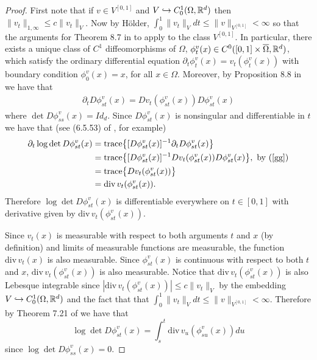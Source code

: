 \documentclass[noinfoline]{imsart}
\begin{document}
\begin{proof}
First note that if $v\in V^{[0,1]}$ and $V\hookrightarrow C_0^1(\Omega, \Bbb R^d)$ then $ \| v_t \|_{1,\infty} \leq c \| v_t \|_{V} $. Now by H\"older, $\int_0^1 \| v_t \|_{V} dt \leq \|v \|_{V^{[0,1]}}<\infty$  so that the arguments for  Theorem 8.7   in \cite{you:10} to apply to the class  $ V^{[0,1]}$. In particular, there exists a unique  class of $C^1$ diffeomorphisms of $\Omega$, $\phi_t^v(x)\in C^0 ([0,1]\times \overline \Omega,\Bbb R^d)$, which satisfy the ordinary differential equation $\partial_t \phi_t^v(x) = v_t(\phi_t^v(x))$
 with boundary condition $\phi_0^v(x)=x$, for all $x\in \Omega$. Moreover, by Proposition 8.8 in \cite{you:10} we have that
 \begin{align}
    \partial_t D\phi_{st}^v(x)  =  D v_t (\phi_{st}^v(x))  D\phi_{st}^v(x) \label{gg}
\end{align}
where $\det D\phi_{ss}^v(x)=Id_d$. 
Since $D\phi_{st}^v(x)$ is nonsingular and differentiable in $t$ we have that (see  (6.5.53) of \cite{hor:91}, for example)
\begin{align*}
\partial_t \log \det D\phi_{st}^v(x)&= \text{trace}\bigl\{ [D\phi_{st}^v(x)]^{-1}   \partial_t D\phi_{st}^v(x)  \bigr\} \\
& = \text{trace}\bigl\{ [D\phi_{st}^v(x)]^{-1}  D v_t (\phi_{st}^v(x))  D\phi_{st}^v(x) \bigr\} ,\,\,\text{by (\ref{gg})} \\
& = \text{trace}\bigl\{ D v_t (\phi_{st}^v(x))  \bigr\} \\
& = \text{div}\, v_t (\phi_{st}^v(x)).
\end{align*}
Therefore $\log \det D\phi_{st}^v(x)$ is differentiable everywhere on $t\in [0,1]$ with derivative given by $ \text{div}\, v_t (\phi_{st}^v(x))$.  

Since $v_t(x)$ is measurable with respect to both arguments $t$ and $x$ (by definition) and limits of measurable functions are measurable, the function $\text{div}\,v_t(x)$  is also measurable. Since $\phi^v_{st}(x)$ is continuous with respect to both $t$ and $x$,  $\text{div}\, v_t (\phi_{st}^v(x))$ is also measurable. 
Notice that $\text{div}\, v_t (\phi_{st}^v(x))$  is also Lebesque integrable since $|\text{div}\, v_t (\phi_{st}^v(x))| \leq c\| v_t \|_V$ by the embedding $V\hookrightarrow C_0^1(\Omega,\Bbb R^d)$ and the fact that that  $\int_0^1 \| v_t \|_{V} dt \leq \|v \|_{V^{[0,1]}}<\infty$.
Therefore by Theorem 7.21 of \cite{rud:66} we have that
\[\log \det D\phi_{st}^v(x) =  \int_s^t  \text{div}\, v_u (\phi_{su}^v(x))  du\]
since $\log \det D\phi_{ss}^v(x) = 0$. \end{proof}
\end{document}
